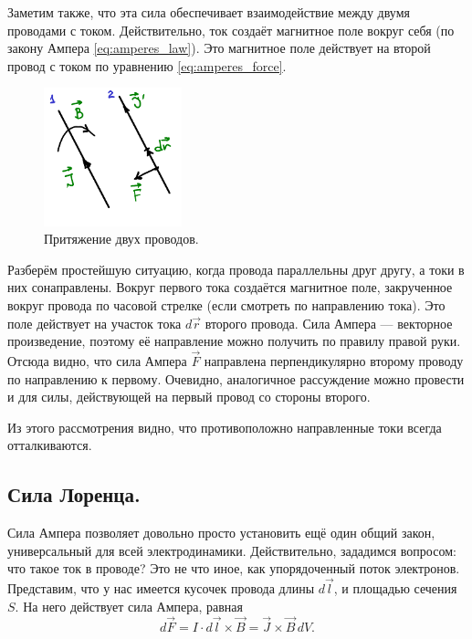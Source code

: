 \documentclass[12pt,a4paper]{article}
\numberwithin{equation}{section}
\numberwithin{equation}{section}
\begin{document}
Заметим также, что эта сила обеспечивает взаимодействие между двумя
проводами с током. Действительно, ток создаёт магнитное поле вокруг
себя (по закону Ампера \eqref{eq:amperes_law}). Это магнитное поле
действует на второй провод с током по уравнению
\eqref{eq:amperes_force}. 

\begin{figure}
  \begin{center}
  \includegraphics[width=4cm]{2wires.pdf}  
  \end{center}
  \vspace{-1cm}
  \caption{Притяжение двух проводов.}
  \label{fig:2wires}
\end{figure}

Разберём простейшую ситуацию, когда провода параллельны друг другу, а
токи в них сонаправлены. Вокруг первого тока создаётся магнитное поле,
закрученное вокруг провода по часовой стрелке (если смотреть по
направлению тока). Это поле действует на участок тока $d\vec{r}$
второго провода. Сила Ампера --- векторное произведение, поэтому её
направление можно получить по правилу правой руки. Отсюда видно, что
сила Ампера $\vec{F}$ направлена перпендикулярно второму проводу по
направлению к первому. Очевидно, аналогичное рассуждение можно
провести и для силы, действующей на первый провод со стороны второго.

Из этого рассмотрения видно, что противоположно направленные токи
всегда отталкиваются. 

\subsection{Сила Лоренца.}
\label{sec:lorentz_force}

Сила Ампера позволяет довольно просто установить ещё один общий закон,
универсальный для всей электродинамики. Действительно, зададимся
вопросом: что такое ток в проводе? Это не что иное, как упорядоченный
поток электронов. Представим, что у нас имеется кусочек провода длины
$d\vec{l}$, и площадью сечения $S$. На него действует сила Ампера,
равная
\begin{equation}
  \label{eq:der_lorentz_force_1}
  d\vec{F} = I \cdot d\vec{l} \times \vec{B} = \vec{J} \times \vec{B}\, dV.
\end{equation}
\end{document}
